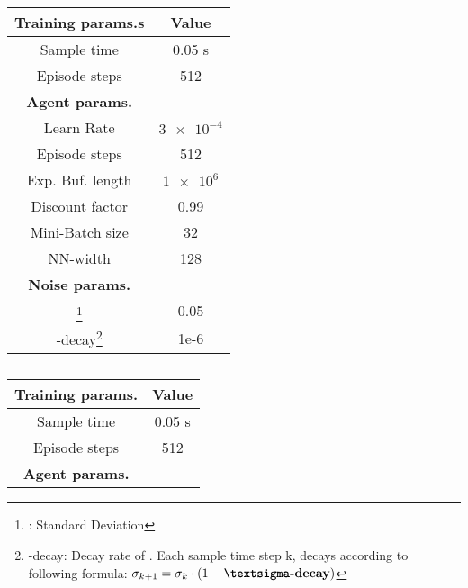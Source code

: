 \begin{table}
	\parbox{.4\linewidth}{
		\centering
		\begin{tabular}{| c | c |} 
		\hline
		\textbf{Training params.s} & \textbf{Value} \\ [0.5ex] 
		\hline
		\hline
		Sample time & 0.05 s \\ 
		
		Episode steps & 512 \\
		
		\hline
		\textbf{Agent params.} &  \\ [0.5ex] 
		\hline
		
		Learn Rate & $\num{3e-4}$ \\
		
		Episode steps & 512 \\
		
		Exp. Buf. length & $\num{1e6}$ \\
		
		Discount factor &  0.99 \\
		
		Mini-Batch size & 32 \\
		
		NN-width & 128 \\
		
		\hline
		\textbf{Noise params.} &  \\ [0.5ex] 
		\hline
		
		\textsigma\footnote{\textsigma: Standard Deviation} & 0.05 \\
		
		\textsigma-decay\footnote{\textsigma-decay: Decay rate of \textsigma. Each sample time step k, \textsigma decays according to following formula: $\sigma_{k+1} = \sigma_k \cdot (1 - \textbf{\textsigma-decay})$} & 1e-6 \\
		
		\hline
	\end{tabular}	
	\caption[DDPG agent parameters]{}
	\label{table:DDPG parameters}
	}
	
	
	\parbox{.4\linewidth}{
		\centering
		\begin{tabular}{| c | c |} 
		\hline
		\textbf{Training params.} & \textbf{Value} \\ [0.5ex] 
		\hline
		\hline
		Sample time & 0.05 s \\ 
		
		Episode steps & 512 \\
		
		\hline
		\textbf{Agent params.} &  \\ [0.5ex] 
		\hline
		

\end{tabular}}
\end{table}
